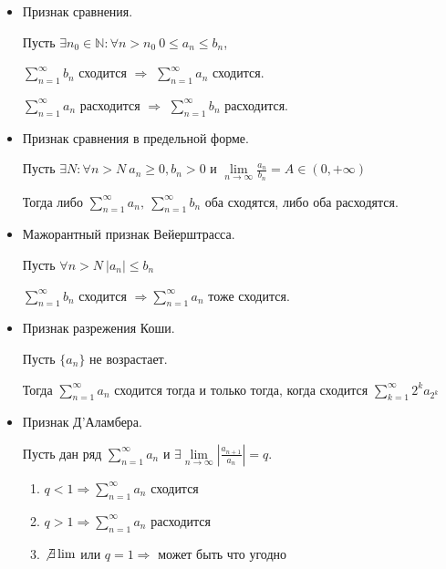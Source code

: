 \documentclass[14pt]{extarticle}
\numberwithin{equation}{section}
\newcommand{\NN}{\mathbb{N}}
\begin{document}
    \begin{itemize}
        \item
            Признак сравнения.

            Пусть \( \exists n_0 \in \NN : \forall n > n_0 \ 0 \leq a_n \leq b_n \),

            \( \sum\limits_{n = 1}^{\infty} b_n \) сходится \( \Rightarrow \) \( \sum\limits_{n = 1}^{\infty} a_n \) сходится.

            \( \sum\limits_{n = 1}^{\infty} a_n \) расходится \( \Rightarrow \) \( \sum\limits_{n = 1}^{\infty} b_n \) расходится.
        \item
            Признак сравнения в предельной форме.

            Пусть \( \exists N : \forall n > N \ a_n \geq 0, b_n > 0 \)
            и \( \lim\limits_{n \to \infty} \frac{a_n}{b_n} = A \in (0, +\infty) \)

            Тогда либо \( \sum\limits_{n = 1}^{\infty} a_n, \ \sum\limits_{n = 1}^{\infty} b_n \) оба сходятся,
            либо оба расходятся.
        \item
            Мажорантный признак Вейерштрасса.

            Пусть \( \forall n > N \ |a_n| \leq b_n \)

            \( \sum\limits_{n = 1}^{\infty} b_n \) сходится \( \Rightarrow \sum\limits_{n = 1}^{\infty} a_n \) тоже сходится.
        \item
            Признак разрежения Коши.

            Пусть \( \{ a_n \} \) не возрастает.

            Тогда \( \sum\limits_{n = 1}^{\infty} a_n \) сходится тогда и только тогда,
            когда сходится \( \sum\limits_{k = 1}^{\infty} 2^k a_{2^k} \)
        \item
            Признак Д'Аламбера.

            Пусть дан ряд \( \sum\limits_{n = 1}^{\infty} a_n \)
            и \( \exists \lim\limits_{n \to \infty} \left| \frac{a_{n + 1}}{a_n} \right| = q \).
            \begin{enumerate}
                \item
                    \( q < 1 \Rightarrow \sum\limits_{n = 1}^{\infty} a_n \) сходится
                \item
                    \( q > 1 \Rightarrow \sum\limits_{n = 1}^{\infty} a_n \) расходится
                \item
                    \( \not\exists\lim \) или \( q = 1 \Rightarrow \) может быть что угодно
            \end{enumerate}


\end{itemize}
\end{document}
